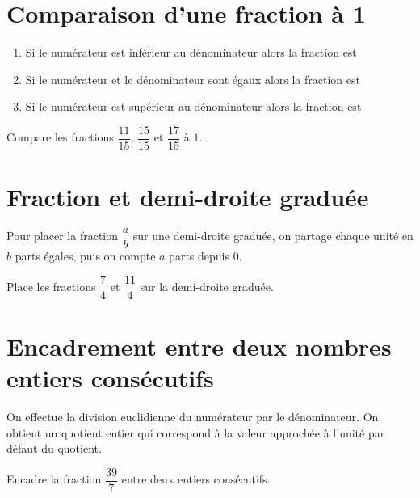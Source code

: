 \documentclass[a4paper,10pt]{report}
\begin{document}
\vspace{0.5cm}
\section{Comparaison d'une fraction à 1}

\begin{prop}
\begin{enumerate}
\item[•]Si le numérateur est inférieur au dénominateur alors la fraction est\dotfill \medskip
\item[•]Si le numérateur et le dénominateur sont égaux alors la fraction est\dotfill \medskip
\item[•]Si le numérateur est supérieur au dénominateur alors la fraction est \dotfill
\end{enumerate}
\end{prop}

\begin{ex}
Compare les fractions $\dfrac{11}{15}$, $\dfrac{15}{15}$ et $\dfrac{17}{15}$ à $1$.

\noindent\grandscarreaux{\linewidth}{3cm}
\end{ex}

\section{Fraction et demi-droite graduée}

\begin{prop}
Pour placer la fraction $\dfrac{a}{b}$ sur une demi-droite graduée, on partage chaque unité en $b$ parts égales, puis on compte $a$ parts depuis $0$.
\end{prop}

\begin{ex}
Place les fractions $\dfrac{7}{4}$ et $\dfrac{11}{4}$ sur la demi-droite graduée.

\begin{center}
\end{center}
\end{ex}

\section{Encadrement entre deux nombres entiers consécutifs}

\begin{prop}
On effectue la division euclidienne du numérateur par le dénominateur. On obtient un quotient entier qui correspond à la valeur approchée à l'unité par défaut du quotient.
\end{prop}

\begin{ex}
Encadre la fraction $\dfrac{39}{7}$ entre deux entiers consécutifs.

\noindent\grandscarreaux{\linewidth}{3cm}
\end{ex}
\end{document}
